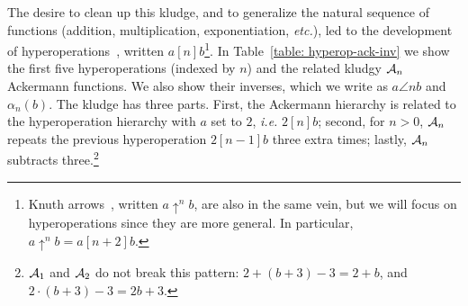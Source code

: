 The desire to clean up this kludge, and to generalize the natural sequence
of functions (addition, multiplication, exponentiation, \emph{etc.}),
led to the development of hyperoperations~\cite{goodstein},
written $a [n] b$\footnote{Knuth arrows~\cite{knuth}, written $a \uparrow^n b$,
are also in the same vein, but we will focus on hyperoperations
since they are more general. In particular, $a \uparrow^n b = a[n+2]b$.}.
In Table~\ref{table: hyperop-ack-inv} we show the first five hyperoperations
(indexed by $n$) and the related kludgy $\mathcal{A}_n$ Ackermann functions.
We also show their inverses,
which we write as $a \angle{n} b$ and $\alpha_n(b)$.
The kludge has three parts. First, the Ackermann hierarchy is related
to the hyperoperation hierarchy with $a$ set to $2$, \emph{i.e.} $2[n]b$;
second, for $n>0$, $\mathcal{A}_n$ repeats the previous hyperoperation $2[n-1]b$
three extra times;
lastly, $\mathcal{A}_n$ subtracts three.\footnote{$\mathcal{A}_{1}$ and $\mathcal{A}_{2}$ do not break this pattern: $2 + (b + 3) - 3 = 2 + b$, and $2 \cdot (b + 3) - 3 = 2b + 3$.}

